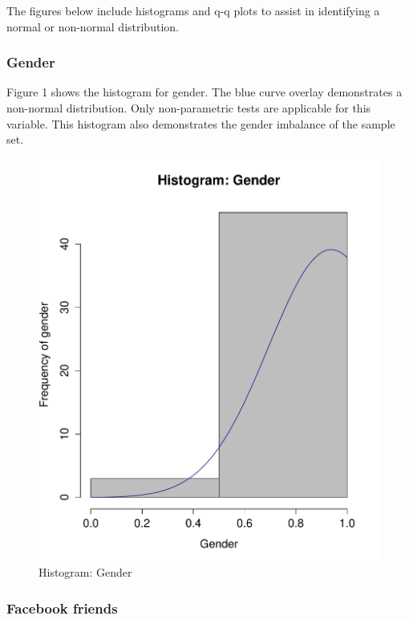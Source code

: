 The figures below include histograms and q-q plots to assist in identifying a normal or non-normal distribution.

\subsubsection{Gender}

Figure 1 shows the histogram for gender. The blue curve overlay demonstrates a non-normal distribution. Only non-parametric tests are applicable for this variable. This histogram also demonstrates the gender imbalance of the sample set.


\begin{figure}[H]
\centering
\caption{Histogram: Gender}
\includegraphics[scale=0.35]{./img/hist_gender.pdf}
\end{figure}

\subsubsection{Facebook friends}

